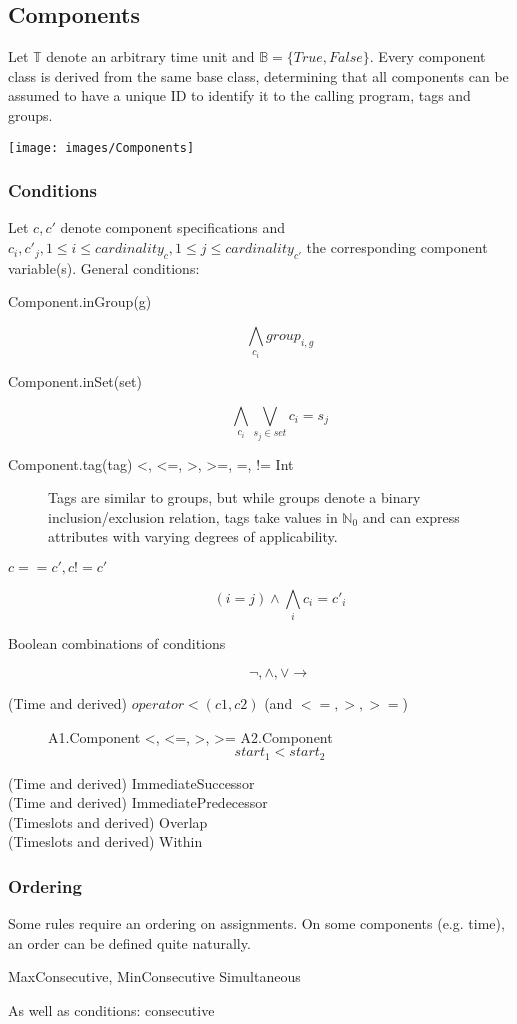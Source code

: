 \subsection{Components}
Let $\mathbb{T}$ denote an arbitrary time unit and $\mathbb{B}=\{True, False\}$. Every component class is derived from the same base class, determining that all components can be assumed to have a unique ID to identify it to the calling program, tags and groups.

\texttt{[image: images/Components]}

\subsubsection*{Conditions}
Let $c, c'$ denote component specifications and $c_i, c'_j, 1\leq i \leq cardinality_c, 1\leq j\leq cardinality_{c'}$ the corresponding component variable(s).
General conditions:
\begin{description}
\item[Component.inGroup(g)]
$$\bigwedge_{c_i} group_{i,g}$$

\item[Component.inSet(set)]
$$\bigwedge_{c_i}\bigvee_{s_j\in set} c_i = s_j$$

\item[Component.tag(tag) <, <=, >, >=, =, != Int]
Tags are similar to groups, but while groups denote a binary inclusion/exclusion relation, tags take values in $\mathbb{N}_0$ and can express attributes with varying degrees of applicability.

\item[$c==c', c!=c'$]
$$ (i = j) \wedge \bigwedge_i c_i = c'_i $$

\item[Boolean combinations of conditions]
$$\neg, \wedge, \vee \rightarrow$$

\item[(Time and derived) $operator<(c1, c2)$ (and $<=, >, >=$)]
A1.Component <, <=, >, >= A2.Component
$$ start_1 < start_2 $$
\item[(Time and derived) ImmediateSuccessor]
\item[(Time and derived) ImmediatePredecessor]
\item[(Timeslots and derived) Overlap]
\item[(Timeslots and derived) Within]
\end{description}


\subsubsection{Ordering}
Some rules require an ordering on assignments.
On some components (e.g. time), an order can be defined quite naturally.

MaxConsecutive, MinConsecutive
Simultaneous

As well as conditions:
consecutive
